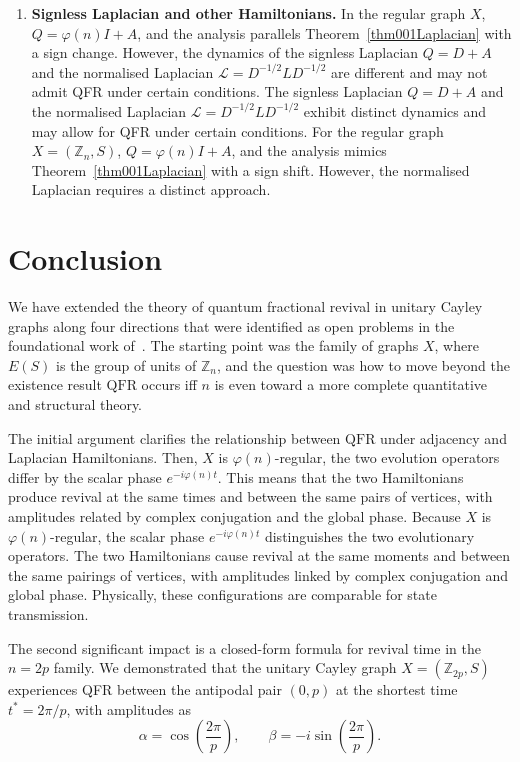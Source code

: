 \documentclass[12pt]{amsart}
\newcommand{\QFR}{\mathrm{QFR}}
\begin{document}
\begin{enumerate}
  \item \textbf{Signless Laplacian and other Hamiltonians.} In the regular graph $X$, $Q=\varphi(n)I + A$, and the analysis parallels Theorem~\ref{thm001Laplacian} with a sign change. However, the dynamics of the signless Laplacian $Q = D + A$ and the normalised Laplacian $\mathcal{L} = D^{-1/2}LD^{-1/2}$ are different and may not admit QFR under certain conditions. The signless Laplacian $Q = D + A$ and the normalised Laplacian $\mathcal{L} = D^{-1/2}LD^{-1/2}$ exhibit distinct dynamics and may allow for QFR under certain conditions. For the regular graph $X = (\mathbb{Z}_n, S)$, $Q = \varphi(n)I + A$, and the analysis mimics Theorem~\ref{thm001Laplacian} with a sign shift. However, the normalised Laplacian requires a distinct approach.
\end{enumerate}

\section{Conclusion}
We have extended the theory of quantum fractional revival in unitary Cayley graphs along four
directions that were identified as open problems in the foundational work of~\cite{soni2025original}.
The starting point was the family of graphs $X$, where $E(S)$ is the group
of units of $\mathbb{Z}_n$, and the question was how to move beyond the existence result
$\QFR$ occurs iff $n$ is even toward a more complete quantitative and structural theory.

The initial argument clarifies the relationship between $\QFR$ under adjacency and Laplacian Hamiltonians. Then, $X$ is $\varphi(n)$-regular, the two evolution operators differ by the scalar phase $e^{-i\varphi(n)t}$. This means that the two Hamiltonians produce revival at the same times and between the same pairs of vertices, with amplitudes related by complex conjugation and the global phase. Because $X$ is $\varphi(n)$-regular, the scalar phase $e^{-i\varphi(n)t}$ distinguishes the two evolutionary operators. The two Hamiltonians cause revival at the same moments and between the same pairings of vertices, with amplitudes linked by complex conjugation and global phase. Physically, these configurations are comparable for state transmission. 

The second significant impact is a closed-form formula for revival time in the $n = 2p$ family. We demonstrated that the unitary Cayley graph $X = (\mathbb{Z}_{2p}, S)$ experiences QFR between the antipodal pair $(0, p)$ at the shortest time $t^* = 2\pi/p$, with amplitudes as
\[
  \alpha = \cos\!\left(\frac{2\pi}{p}\right), \qquad \beta = -i\sin\!\left(\frac{2\pi}{p}\right).
\]
\end{document}
